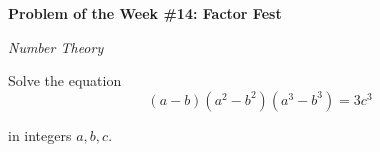 \begin{potw}\vspace{5pt}
{\large\textbf{Problem of the Week \#14: Factor Fest}}\vspace{5pt}

\textit{Number Theory}\V

Solve the equation 
\[(a-b)(a^2-b^2)(a^3-b^3) = 3c^3\]

in integers $a,b,c$.
\end{potw}\V
